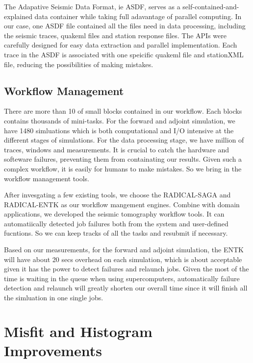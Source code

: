 \documentclass[extra,mreferee]{gji}
\begin{document}
The Adapative Seismic Data Format, ie ASDF, serves as a self-contained-and-explained data container while taking full adavantage of parallel computing. In our case, one ASDF file contained all the files need in data processing, including the seismic traces, quakeml files and station response files. The APIs were carefully designed for easy data extraction and parallel implementation. Each trace in the ASDF is associated with one speicific quakeml file and stationXML file, reducing the possibilities of making mistakes.

\cite{ASDF2016}
\cite{BookChapter}

\subsection{Workflow Management}

There are more than 10 of small blocks contained in our workflow. Each blocks contains thousands of mini-tasks. For the forward and adjoint simulation, we have 1480 simluations which is both computational and I/O intensive at the different stages of simulations. For the data processing stage, we have million of traces, windows and measurements. It is crucial to catch the hardware and softeware failures, preventing them from containating our results. Given such a complex workflow, it is easily for humans to make mistakes. So we bring in the workflow management tools. 

After invesgating a few existing tools, we choose the RADICAL-SAGA and RADICAL-ENTK as our workflow mangement engines. Combine with domain applications, we developed the seismic tomography workflow tools. It can automatiically detected job failures both from the system and user-defined fucntions. So we can keep tracks of all the tasks and resubmit if necessary.

Based on our measurements, for the forward and adjoint simulation, the ENTK will have about 20 secs overhead on each simulation, which is about acceptable given it has the power to detect failures and relaunch jobs. Given the most of the time is waiting in the queue when using supercomputers, automatically failure detection and relaunch will greatly shorten our overall time since it will finish all the simluation in one single jobs.


\section{Misfit and Histogram Improvements}
\end{document}

